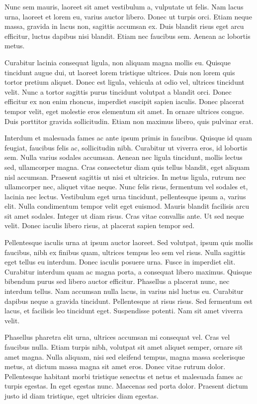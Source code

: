 \documentclass[12pt, twoside]{report}\usepackage[]{graphicx}\usepackage[]{color}
\begin{document}
Nunc sem mauris, laoreet sit amet vestibulum a, vulputate ut felis. Nam lacus urna, laoreet et lorem eu, varius auctor libero. Donec ut turpis orci. Etiam neque massa, gravida in lacus non, sagittis accumsan ex. Duis blandit risus eget arcu efficitur, luctus dapibus nisi blandit. Etiam nec faucibus sem. Aenean ac lobortis metus.

Curabitur lacinia consequat ligula, non aliquam magna mollis eu. Quisque tincidunt augue dui, ut laoreet lorem tristique ultrices. Duis non lorem quis tortor pretium aliquet. Donec est ligula, vehicula at odio vel, ultrices tincidunt velit. Nunc a tortor sagittis purus tincidunt volutpat a blandit orci. Donec efficitur ex non enim rhoncus, imperdiet suscipit sapien iaculis. Donec placerat tempor velit, eget molestie eros elementum sit amet. In ornare ultrices congue. Duis porttitor gravida sollicitudin. Etiam non maximus libero, quis pulvinar erat.

Interdum et malesuada fames ac ante ipsum primis in faucibus. Quisque id quam feugiat, faucibus felis ac, sollicitudin nibh. Curabitur ut viverra eros, id lobortis sem. Nulla varius sodales accumsan. Aenean nec ligula tincidunt, mollis lectus sed, ullamcorper magna. Cras consectetur diam quis tellus blandit, eget aliquam nisl accumsan. Praesent sagittis ut nisi et ultricies. In metus ligula, rutrum nec ullamcorper nec, aliquet vitae neque. Nunc felis risus, fermentum vel sodales et, lacinia nec lectus. Vestibulum eget urna tincidunt, pellentesque ipsum a, varius elit. Nulla condimentum tempor velit eget euismod. Mauris blandit facilisis arcu sit amet sodales. Integer ut diam risus. Cras vitae convallis ante. Ut sed neque velit. Donec iaculis libero risus, at placerat sapien tempor sed.

Pellentesque iaculis urna at ipsum auctor laoreet. Sed volutpat, ipsum quis mollis faucibus, nibh ex finibus quam, ultrices tempus leo sem vel risus. Nulla sagittis eget tellus eu interdum. Donec iaculis posuere urna. Fusce in imperdiet elit. Curabitur interdum quam ac magna porta, a consequat libero maximus. Quisque bibendum purus sed libero auctor efficitur. Phasellus a placerat nunc, nec interdum tellus. Nam accumsan nulla lacus, in varius nisl luctus eu. Curabitur dapibus neque a gravida tincidunt. Pellentesque at risus risus. Sed fermentum est lacus, et facilisis leo tincidunt eget. Suspendisse potenti. Nam sit amet viverra velit.

Phasellus pharetra elit urna, ultrices accumsan mi consequat vel. Cras vel faucibus nulla. Etiam turpis nibh, volutpat sit amet aliquet semper, ornare sit amet magna. Nulla aliquam, nisi sed eleifend tempus, magna massa scelerisque metus, at dictum massa magna sit amet eros. Donec vitae rutrum dolor. Pellentesque habitant morbi tristique senectus et netus et malesuada fames ac turpis egestas. In eget egestas nunc. Maecenas sed porta dolor. Praesent dictum justo id diam tristique, eget ultricies diam egestas.
\end{document}
